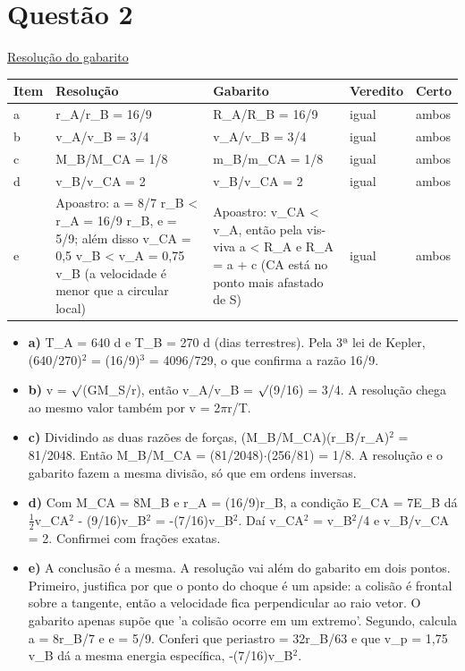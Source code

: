 \documentclass{article}%
\begin{document}
\section*{Questão 2}%
\href{https://poliedroresolve.sistemapoliedro.com.br/vestibulares/ime/2026/ime-2-fase-dia-2-24-10-2025-2-fase-dia-2/dissertativa-2-fisica-2-fase-dia-2-ime-2026}{Resolução do gabarito}\par\smallskip%
\begin{longtable}{@{}p{} p{} p{} p{} p{}@{}}\toprule Item & Resolução & Gabarito & Veredito & Certo \\ \midrule
a & r\_A/r\_B = 16/9 & R\_A/R\_B = 16/9 & igual & ambos \\
b & v\_A/v\_B = 3/4 & v\_A/v\_B = 3/4 & igual & ambos \\
c & M\_B/M\_CA = 1/8 & m\_B/m\_CA = 1/8 & igual & ambos \\
d & v\_B/v\_CA = 2 & v\_B/v\_CA = 2 & igual & ambos \\
e & Apoastro: a = 8/7 r\_B < r\_A = 16/9 r\_B, e = 5/9; além disso v\_CA = 0,5 v\_B < v\_A = 0,75 v\_B (a velocidade é menor que a circular local) & Apoastro: v\_CA < v\_A, então pela vis{-}viva a < R\_A e R\_A = a + c (CA está no ponto mais afastado de S) & igual & ambos \\
\bottomrule\end{longtable}%
\begin{itemize}%
\item%
\textbf{a)} T\_A = 640 d e T\_B = 270 d (dias terrestres). Pela 3ª lei de Kepler, (640/270)$^2$ = (16/9)$^3$ = 4096/729, o que confirma a razão 16/9.%
\item%
\textbf{b)} v = $\surd$(GM\_S/r), então v\_A/v\_B = $\surd$(9/16) = 3/4. A resolução chega ao mesmo valor também por v = 2$\pi$r/T.%
\item%
\textbf{c)} Dividindo as duas razões de forças, (M\_B/M\_CA)(r\_B/r\_A)$^2$ = 81/2048. Então M\_B/M\_CA = (81/2048)$\cdot$(256/81) = 1/8. A resolução e o gabarito fazem a mesma divisão, só que em ordens inversas.%
\item%
\textbf{d)} Com M\_CA = 8M\_B e r\_A = (16/9)r\_B, a condição E\_CA = 7E\_B dá $\frac12$v\_CA$^2$ - (9/16)v\_B$^2$ = -(7/16)v\_B$^2$. Daí v\_CA$^2$ = v\_B$^2$/4 e v\_B/v\_CA = 2. Confirmei com frações exatas.%
\item%
\textbf{e)} A conclusão é a mesma. A resolução vai além do gabarito em dois pontos. Primeiro, justifica por que o ponto do choque é um apside: a colisão é frontal sobre a tangente, então a velocidade fica perpendicular ao raio vetor. O gabarito apenas supõe que 'a colisão ocorre em um extremo'. Segundo, calcula a = 8r\_B/7 e e = 5/9. Conferi que periastro = 32r\_B/63 e que v\_p = 1,75 v\_B dá a mesma energia específica, -(7/16)v\_B$^2$.%
\end{itemize}%
\end{document}
